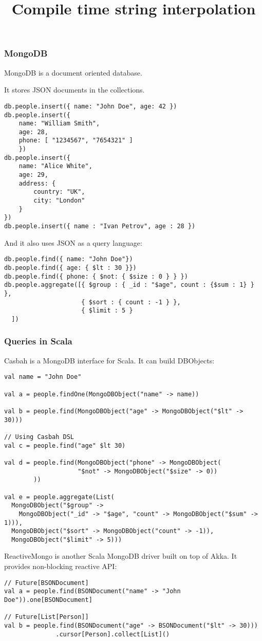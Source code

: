 

\title{Compile time string interpolation}



\begin{frame}
    \titlepage
\end{frame}

\begin{frame}[fragile]
\frametitle{MongoDB}
MongoDB is a document oriented database.

It stores JSON documents in the collections.
\begin{lstlisting}
db.people.insert({ name: "John Doe", age: 42 })
db.people.insert({ 
    name: "William Smith",
    age: 28,
    phone: [ "1234567", "7654321" ]
    })
db.people.insert({
    name: "Alice White",
    age: 29,
    address: {
        country: "UK",
        city: "London"
    }
})
db.people.insert({ name : "Ivan Petrov", age : 28 })
\end{lstlisting}

And it also uses JSON as a query language:
\begin{lstlisting}
db.people.find({ name: "John Doe"})
db.people.find({ age: { $lt : 30 }})
db.people.find({ phone: { $not: { $size : 0 } } })
db.people.aggregate([{ $group : { _id : "$age", count : {$sum : 1} } },
                     { $sort : { count : -1 } },
                     { $limit : 5 }
  ])
\end{lstlisting}
\end{frame}

\begin{frame}[fragile]
\frametitle{Queries in Scala}
Casbah is a MongoDB interface for Scala.  It can build DBObjects:

\begin{lstlisting}
val name = "John Doe"

val a = people.findOne(MongoDBObject("name" -> name))

val b = people.find(MongoDBObject("age" -> MongoDBObject("$lt" -> 30)))

// Using Casbah DSL
val c = people.find("age" $lt 30)

val d = people.find(MongoDBObject("phone" -> MongoDBObject(
                    "$not" -> MongoDBObject("$size" -> 0))
        ))

val e = people.aggregate(List(
  MongoDBObject("$group" ->
    MongoDBObject("_id" -> "$age", "count" -> MongoDBObject("$sum" -> 1))),
  MongoDBObject("$sort" -> MongoDBObject("count" -> -1)),
  MongoDBObject("$limit" -> 5)))
\end{lstlisting}

ReactiveMongo is another Scala MongoDB driver built on top of Akka.  It provides
non-blocking reactive API:

\begin{lstlisting}
// Future[BSONDocument]
val a = people.find(BSONDocument("name" -> "John Doe")).one[BSONDocument]

// Future[List[Person]]
val b = people.find(BSONDocument("age" -> BSONDocument("$lt" -> 30)))
              .cursor[Person].collect[List]()
\end{lstlisting}
\end{frame}

